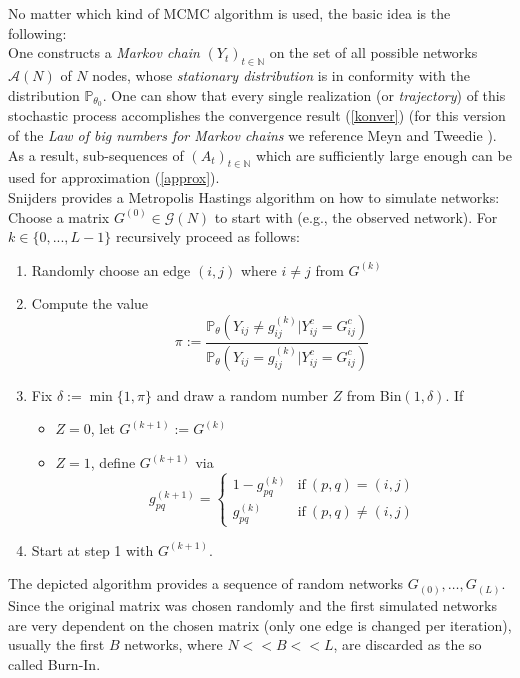 \documentclass[headsepline=true, abstracton]{scrartcl}
\begin{document}
No matter which kind of MCMC algorithm is used, the basic idea is the following:
\\One constructs a \textit{Markov chain} $(Y_t)_{t \in \mathbb{N}}$ on the set of all possible networks $\mathcal{A}(N)$ of $N$ nodes, whose \textit{stationary distribution} is in conformity with the distribution $\mathbb{P}_{\theta_0}$. One can show that every single realization (or \textit{trajectory}) 
of this stochastic process accomplishes the convergence result (\ref{konver}) (for this version of the \textit{Law of big numbers for Markov chains} we reference Meyn and Tweedie \cite{Meyn.2009}). As a result, sub-sequences of $(A_t)_{t \in \mathbb{N}}$ which are sufficiently large enough can be used for approximation (\ref{approx}).\\[0.3cm]
Snijders \cite{Snijders.2002} provides a Metropolis Hastings algorithm on how to simulate networks:
Choose a matrix $G^{(0)} \in \mathcal{G}(N)$ to start with (e.g., the observed network). For $k \in \{0,...,L-1\}$ recursively proceed as follows:\\
\begin{enumerate}
\item Randomly choose an edge $(i,j)$ where $i \neq j$ from $G^{(k)}$
\item Compute the value
$$\pi := \dfrac{\mathbb{P}_{\theta}(Y_{ij} \neq g_{ij}^{(k)} | Y_{ij}^c=G_{ij}^c)}{\mathbb{P}_{\theta}(Y_{ij}= g_{ij}^{(k)} | Y_{ij}^c=G_{ij}^c)}$$
\item Fix $\delta:= \min\{1, \pi\}$ and draw a random number $Z$ from Bin$(1, \delta)$. If
\begin{itemize}
\item $Z=0$, let $G^{(k+1)} := G^{(k)}$ 
\item $Z=1$, define $G^{(k+1)}$ via
$$g_{pq}^{(k+1)}=\begin{cases}
1-g_{pq}^{(k)}& \text{if}~ (p,q)=(i,j) \\
g_{pq}^{(k)} &\text{if}~ (p,q) \neq (i,j) 
\end{cases}$$
\end{itemize}
\item Start at step 1 with $G^{(k+1)}$.
\end{enumerate}
The depicted algorithm provides a sequence of random networks $G_(0),\dots,G_(L)$. Since the original matrix was chosen randomly and the first simulated networks are very dependent on the chosen matrix (only one edge is changed per iteration), usually
the first $B$ networks, where $N << B << L$, are discarded as the so called Burn-In.
\end{document}
